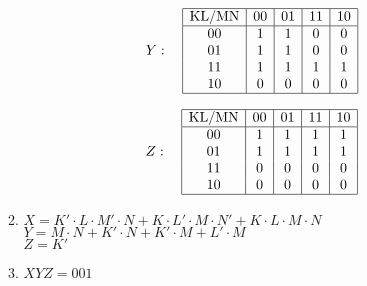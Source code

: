 \documentclass[12pt, a4paper]{article}
\begin{document}
\begin{enumerate}[Q\arabic*.]
\begin{enumerate}[(\alph*.)]
        \[
        Y: \quad
        \begin{array}{|c|c|c|c|c|}
        \hline
        \text{KL/MN} & 00 & 01 & 11 & 10 \\
        \hline
        00 & 1 & 1 & 0 & 0 \\
        01 & 1 & 1 & 0 & 0 \\
        11 & 1 & 1 & 1 & 1 \\
        10 & 0 & 0 & 0 & 0 \\
        \hline
        \end{array}
        \]  

        \[
        Z: \quad
        \begin{array}{|c|c|c|c|c|}
        \hline
        \text{KL/MN} & 00 & 01 & 11 & 10 \\
        \hline
        00 & 1 & 1 & 1 & 1 \\
        01 & 1 & 1 & 1 & 1 \\
        11 & 0 & 0 & 0 & 0 \\
        10 & 0 & 0 & 0 & 0 \\
        \hline
        \end{array}
        \]

      \item $X = K'\cdot L\cdot M'\cdot N + K\cdot L'\cdot M\cdot N'+ K\cdot L\cdot M\cdot N$\\
        $Y= M\cdot N + K'\cdot N+ K'\cdot M + L'\cdot M$\\
        $Z = K'$

      \item $XYZ = 001$
    \end{enumerate}
\end{enumerate}
\end{document}
